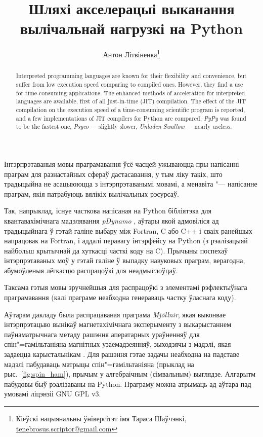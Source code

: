 \documentclass[a4paper,12pt]{article}
\newcommand{\progname}{\textit} %
\begin{document}
\renewcommand{\figurename}{Рыс.} %
\renewcommand{\abstractname}{Анатацыя}
\renewcommand{\refname}{Літаратура}

\title{Шляхі акселерацыі выканання вылічальнай нагрузкі на Python}
\author{Антон Літвіненка\footnote{Кіеўскі нацыянальны ўніверсітэт імя Тараса Шаўчэнкі, \url{tenebrosus.scriptor@gmail.com}}}
\maketitle

\begin{abstract}
Interpreted programming languages are known for their fle\-xibility and convenience, but suffer from low execution speed comparing to compiled ones. However, they find a use for time-consuming applications. The enhanced methods of acceleration for interpreted languages are available, first of all just-in-time (JIT) compilation. The effect of the JIT compilation on the execution speed of a time-consuming scientific program is re\-ported, and a few imp\-le\-mentations of JIT compilers for Python are compared. \progname{PyPy} was found to be the fastest one, \progname{Psyco} --- slightly slower, \progname{Unladen Swallow} --- nearly useless.
\end{abstract}

Інтэрпрэтаваныя мовы праграмавання ўсё часцей ужываюцца пры напісанні праграм для разнастайных сфераў дастасавання, у тым ліку такіх, што традыцыйна не асацыююцца з інтэрпрэтаванымі мовамі, а менавіта "--- напісанне праграм, якія патрабуюць вялікіх вылічальных рэсурсаў.

Так, напрыклад, існуе часткова напісаная на Python бібліятэка для квантавахімічнага мадэлявання \progname{pDynamo} \cite{pDynamo}, аўтары якой адмовіліся ад традыцыйнага ў гэтай галіне выбару між Fortran, C або C++ і сваіх ранейшых напрацовак на Fortran, і аддалі перавагу інтэрфейсу на Python (з рэалізацыяй найбольш крытычнай да хуткасці часткі коду на C). Прычыны поспехаў інтэрпрэтаваных моў у гэтай галіне ў выпадку навуковых праграм, верагодна, абумоўленыя лёгкасцю распрацоўкі для неадмыслоўцаў.

Таксама гэтыя мовы зручнейшыя для распрацоўкі з элементамі рэфлектыўнага праграмавання (калі праграме неабходна генераваць частку ўласнага коду).

Аўтарам дакладу была распрацаваная праграма \progname{Mj{\"o}llnir}, якая выконвае інтэрпрэтацыю вынікаў магнетахімічнага эксперыменту з выкарыстаннем паўнаматрычнага метаду рашэння аператарных ураўненняў для спін"=гамільтаніяна магнітных узаемадзеянняў, зыходзячы з мадэлі, якая задаецца карыстальнікам \cite{Mjollnir}. Для рашэння гэтае задачы неабходна на падставе мадэлі пабудаваць матрыцы спін"=гамільтаніяна (прыклад на рыс.~\ref{fig:spin_ham}), прычым у алгебраічным (сімвальным) выглядзе. Алгарытм пабудовы быў рэалізаваны на Python. Праграму можна атрымаць ад аўтара пад умовамі ліцэнзіі GNU GPL v3.
\end{document}
